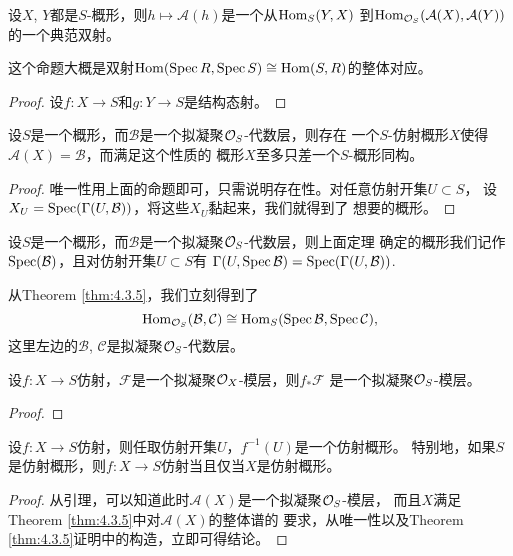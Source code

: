 \begin{pro}
设$X$, $Y$都是$S$-概形，则$h\mapsto \mathcal A(h)$是一个从$\operatorname{Hom}_S(Y,X)$
到$\operatorname{Hom}_{\mathcal{O}_S}(\mathcal A(X),\mathcal A(Y))$的一个典范双射。
\end{pro}

这个命题大概是双射$\operatorname{Hom}(\operatorname{Spec} R,\operatorname{Spec} S)\cong \operatorname{Hom}(S,R)$的整体对应。

\begin{proof}
设$f:X\to S$和$g:Y\to S$是结构态射。\notprove
\end{proof}

\begin{thm}\label{thm:4.3.5}
设$S$是一个概形，而$\mathcal B$是一个拟凝聚$\mathcal{O}_S$-代数层，则存在
一个$S$-仿射概形$X$使得$\mathcal A(X)=\mathcal B$，而满足这个性质的
概形$X$至多只差一个$S$-概形同构。
\end{thm}

\begin{proof}
唯一性用上面的命题即可，只需说明存在性。对任意仿射开集$U\subset S$，
设$X_U=\operatorname{Spec}(\Gamma(U,\mathcal B))$，将这些$X_U$黏起来，我们就得到了
想要的概形。\notprove
\end{proof}

\begin{para}[整体谱]
设$S$是一个概形，而$\mathcal B$是一个拟凝聚$\mathcal{O}_S$-代数层，则上面定理
确定的概形我们记作$\operatorname{Spec} (\mathcal B)$，且对仿射开集$U\subset S$有
$\Gamma(U,\operatorname{Spec} \mathcal B)=\operatorname{Spec} (\Gamma(U,\mathcal B))$. 
\end{para}

从Theorem \ref{thm:4.3.5}，我们立刻得到了
\[
	\operatorname{Hom}_{\mathcal{O}_S}(\mathcal B,\mathcal C)\cong 
	\operatorname{Hom}_S(\operatorname{Spec}\mathcal B,\operatorname{Spec}\mathcal C),
\]
这里左边的$\mathcal B$, $\mathcal C$是拟凝聚$\mathcal{O}_S$-代数层。

\begin{lem}
设$f:X\to S$仿射，$\mathcal F$是一个拟凝聚$\mathcal{O}_X$-模层，则$f_*\mathcal F$
是一个拟凝聚$\mathcal{O}_S$-模层。
\end{lem}

\begin{proof}
\notprove
\end{proof}

\begin{pro}
设$f:X\to S$仿射，则任取仿射开集$U$，$f^{-1}(U)$是一个仿射概形。
特别地，如果$S$是仿射概形，则$f:X\to S$仿射当且仅当$X$是仿射概形。
\end{pro}

\begin{proof}
从引理，可以知道此时$\mathcal A(X)$是一个拟凝聚$\mathcal{O}_S$-模层，
而且$X$满足Theorem \ref{thm:4.3.5}中对$\mathcal A(X)$的整体谱的
要求，从唯一性以及Theorem \ref{thm:4.3.5}证明中的构造，立即可得结论。
\end{proof}

